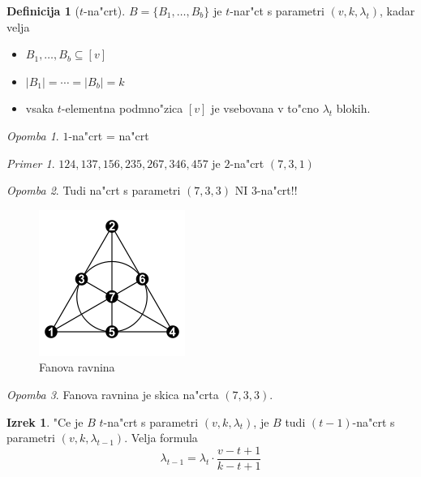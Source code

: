 \documentclass[a4paper,12pt]{article}
\theoremstyle{definition}
\newtheorem{defn}[counter]{Definicija}
\newtheorem{theorem}[counter]{Izrek}
\theoremstyle{remark}
\newtheorem*{ex}{Primer}
\newtheorem*{rem}{Opomba}
\begin{document}
\begin{defn}[$t$-na"crt]
	$B = \{B_1, \ldots, B_b\}$ je $t$-nar"ct s parametri $(v, k, \lambda_t)$, kadar velja
	\begin{itemize}
		\item $B_1, \ldots, B_b \subseteq [v]$
		\item $|B_1| = \cdots = |B_b| = k$
		\item vsaka $t$-elementna podmno"zica $[v]$ je vsebovana v to"cno $\lambda_t$ blokih.
	\end{itemize}
\end{defn}
\begin{rem}
	$1$-na"crt = na"crt
\end{rem}
\begin{ex}
	$124, 137, 156, 235, 267, 346, 457$ je $2$-na"crt $(7, 3, 1)$
\end{ex}
\begin{rem}
	Tudi na"crt s parametri $(7, 3, 3)$ NI $3$-na"crt!!
\end{rem}

\begin{figure}[h!]
	\centering
	\includegraphics[scale=0.5]{fano_plane}
	\caption{Fanova ravnina}
\end{figure}
\begin{rem}
	\label{TODO: there's actually more to this, please add content}
	Fanova ravnina je skica na"crta $(7, 3, 3)$.
\end{rem}

\begin{theorem}
	"Ce je $B$ $t$-na"crt s parametri $(v, k, \lambda_t)$, je $B$ tudi $(t-1)$-na"crt s parametri $(v, k, \lambda_{t-1})$. Velja formula
	\[\lambda_{t-1} = \lambda_t \cdot \frac{v - t + 1}{k - t + 1}\]
\end{theorem}
\end{document}
